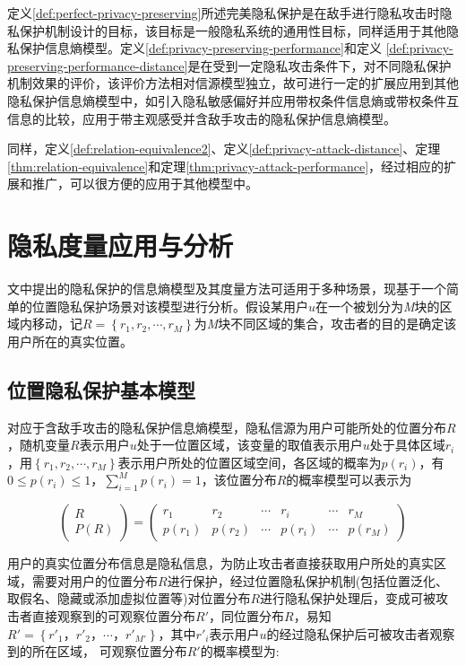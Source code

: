定义\ref{def:perfect-privacy-preserving}所述完美隐私保护是在敌手进行隐私攻击时隐私保护机制设计的目标，该目标是一般隐私系统的通用性目标，同样适用于其他隐私保护信息熵模型。定义\ref{def:privacy-preserving-performance}和定义	\ref{def:privacy-preserving-performance-distance}是在受到一定隐私攻击条件下，对不同隐私保护机制效果的评价，该评价方法相对信源模型独立，故可进行一定的扩展应用到其他隐私保护信息熵模型中，如引入隐私敏感偏好并应用带权条件信息熵或带权条件互信息的比较，应用于带主观感受并含敌手攻击的隐私保护信息熵模型。

同样，定义\ref{def:relation-equivalence2}、定义\ref{def:privacy-attack-distance}、定理\ref{thm:relation-equivalence}和定理\ref{thm:privacy-attack-performance}，经过相应的扩展和推广，可以很方便的应用于其他模型中。

\section{隐私度量应用与分析}\label{instance analysis}

文中提出的隐私保护的信息熵模型及其度量方法可适用于多种场景，现基于一个简单的位置隐私保护场景对该模型进行分析。假设某用户$u$在一个被划分为\textit{M}块的区域内移动，记$R=\left \{ r_{1},r_{2},\cdots,r_{M} \right \}$为\textit{M}块不同区域的集合，攻击者的目的是确定该用户所在的真实位置。
\subsection{位置隐私保护基本模型}
对应于含敌手攻击的隐私保护信息熵模型，隐私信源为用户可能所处的位置分布$R$，随机变量$R$表示用户$u$处于一位置区域，该变量的取值表示用户$u$处于具体区域$r_{i}$，用$\left \{ r_{1},r_{2},\cdots,r_{M} \right \}$表示用户所处的位置区域空间，各区域的概率为$p(r_{i})$，有$0\leqslant p(r_{i})\leqslant 1$，$\sum_{i=1}^{M}p(r_{i})=1$，该位置分布$R$的概率模型可以表示为

\begin{equation}
\begin{pmatrix}
R\\ 
P(R)
\end{pmatrix}=\begin{pmatrix}
r_{1} & r_{2} & \cdots  & r_{i} & \cdots  & r_{M}\\ 
p(r_{1})& p(r_{2}) & \cdots & p(r_{i}) & \cdots & p(r_{M})
\end{pmatrix}
\end{equation}

用户的真实位置分布信息是隐私信息，为防止攻击者直接获取用户所处的真实区域，需要对用户的位置分布$R$进行保护，经过位置隐私保护机制(包括位置泛化、取假名、隐藏或添加虚拟位置等)对位置分布$R$进行隐私保护处理后，变成可被攻击者直接观察到的可观察位置分布${R}'$，同位置分布$R$，易知${R}'=\left \{ {r}'_{1}，{r}'_{2}，\cdots ，{r}'_{{M}'} \right \}$，其中${r}'_{i}$表示用户$u$的经过隐私保护后可被攻击者观察到的所在区域， 可观察位置分布${R}'$的概率模型为:

